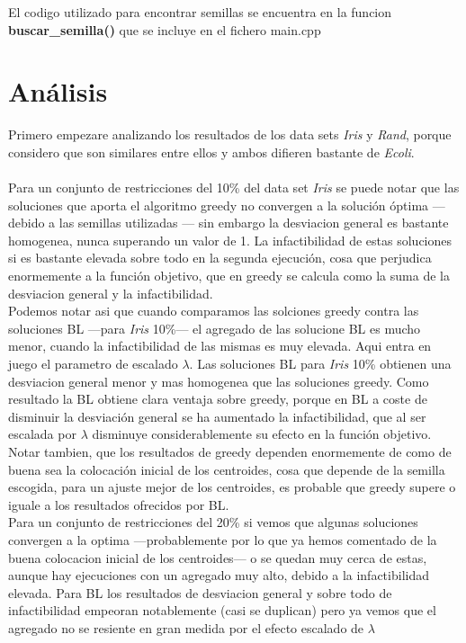 El codigo utilizado para encontrar semillas se encuentra en la funcion \textbf{buscar\_semilla()} que se incluye en el fichero main.cpp


\section{Análisis}
Primero empezare analizando los resultados de los data sets \emph{Iris} y \emph{Rand}, porque considero que son similares entre ellos y ambos difieren bastante de \emph{Ecoli}.\\
\\
Para un conjunto de restricciones del 10\% del data set \emph{Iris} se puede notar que las soluciones que aporta el algoritmo greedy no convergen a la solución óptima --- debido a las semillas utilizadas --- sin embargo la desviacion general es bastante homogenea, nunca superando un valor de 1. La infactibilidad de estas soluciones si es bastante elevada sobre todo en la segunda ejecución, cosa que perjudica enormemente a la función objetivo, que en greedy se calcula como la suma de la desviacion general y la infactibilidad. \\
Podemos notar asi que cuando comparamos las solciones greedy contra las soluciones BL ---para \emph{Iris} 10\%--- el agregado de las solucione BL es mucho menor, cuando la infactibilidad de las mismas es muy elevada. Aqui entra en juego el parametro de escalado $ \lambda $. Las soluciones BL para \emph{Iris} 10\% obtienen una desviacion general menor y mas homogenea que las soluciones greedy. Como resultado la BL obtiene clara ventaja sobre greedy, porque en BL a coste de disminuir la desviación general se ha aumentado la infactibilidad, que al ser escalada por $ \lambda $ disminuye considerablemente su efecto en la función objetivo. Notar tambien, que los resultados de greedy dependen enormemente de como de buena sea la colocación inicial de los centroides, cosa que depende de la semilla escogida, para un ajuste mejor de los centroides, es probable que greedy supere o iguale a los resultados ofrecidos por BL.\\
Para un conjunto de restricciones del 20\% si vemos que algunas soluciones convergen a la optima ---probablemente por lo que ya hemos comentado de la buena colocacion inicial de los centroides--- o se quedan muy cerca de estas, aunque hay ejecuciones con un agregado muy alto, debido a la infactibilidad elevada. Para BL los resultados de desviacion general y sobre todo de infactibilidad empeoran notablemente (casi se duplican) pero ya vemos que el agregado no se resiente en gran medida por el efecto escalado de $ \lambda $\\
